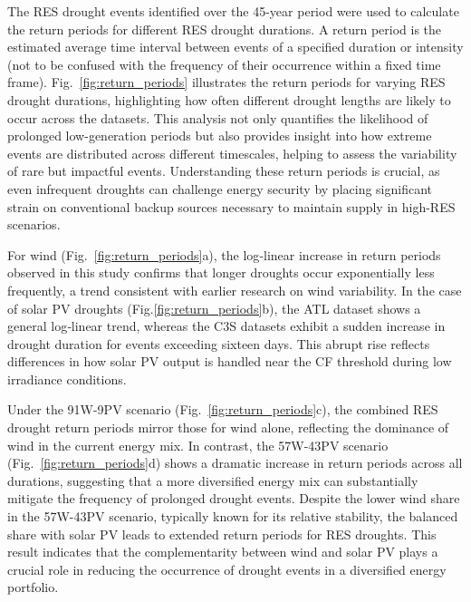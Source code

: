 \documentclass[preprint, 12pt]{elsarticle}
\begin{document}
The RES drought events identified over the 45-year period were used to calculate the return periods for different RES drought durations. A return period is the estimated average time interval between events of a specified duration or intensity (not to be confused with the frequency of their occurrence within a fixed time frame). Fig.~\ref{fig:return_periods} illustrates the return periods for varying RES drought durations, highlighting how often different drought lengths are likely to occur across the datasets. This analysis not only quantifies the likelihood of prolonged low-generation periods but also provides insight into how extreme events are distributed across different timescales, helping to assess the variability of rare but impactful events. Understanding these return periods is crucial, as even infrequent droughts can challenge energy security by placing significant strain on conventional backup sources necessary to maintain supply in high-RES scenarios.

For wind (Fig.~\ref{fig:return_periods}a), the log‐linear increase in return periods observed in this study confirms that longer droughts occur exponentially less frequently, a trend consistent with earlier research on wind variability. In the case of solar PV droughts (Fig.\ref{fig:return_periods}b), the ATL dataset shows a general log‐linear trend, whereas the C3S datasets exhibit a sudden increase in drought duration for events exceeding sixteen days. This abrupt rise reflects differences in how solar PV output is handled near the CF threshold during low irradiance conditions. 

Under the 91W-9PV scenario (Fig.~\ref{fig:return_periods}c), the combined RES drought return periods mirror those for wind alone, reflecting the dominance of wind in the current energy mix. In contrast, the 57W-43PV scenario (Fig.~\ref{fig:return_periods}d) shows a dramatic increase in return periods across all durations, suggesting that a more diversified energy mix can substantially mitigate the frequency of prolonged drought events. Despite the lower wind share in the 57W-43PV scenario, typically known for its relative stability, the balanced share with solar PV leads to extended return periods for RES droughts. This result indicates that the complementarity between wind and solar PV plays a crucial role in reducing the occurrence of drought events in a diversified energy portfolio.
\end{document}
